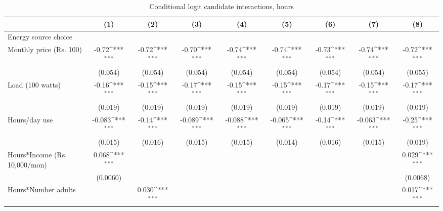\begin{table}[htbp]\centering
\def\sym#1{\ifmmode^{#1}\else\(^{#1}\)\fi}
\caption{Conditional logit candidate interactions, hours}
\begin{tabular*}{1\hsize}{@{\hskip\tabcolsep\extracolsep\fill}l*{8}{c}}
\toprule
                &\multicolumn{1}{c}{(1)}         &\multicolumn{1}{c}{(2)}         &\multicolumn{1}{c}{(3)}         &\multicolumn{1}{c}{(4)}         &\multicolumn{1}{c}{(5)}         &\multicolumn{1}{c}{(6)}         &\multicolumn{1}{c}{(7)}         &\multicolumn{1}{c}{(8)}         \\
\midrule
Energy source choice&                  &                  &                  &                  &                  &                  &                  &                  \\
Monthly price (Rs. 100)&    -0.72\sym{***}&    -0.72\sym{***}&    -0.70\sym{***}&    -0.74\sym{***}&    -0.74\sym{***}&    -0.73\sym{***}&    -0.74\sym{***}&    -0.72\sym{***}\\
                &  (0.054)         &  (0.054)         &  (0.054)         &  (0.054)         &  (0.054)         &  (0.054)         &  (0.054)         &  (0.055)         \\
Load (100 watts)&    -0.16\sym{***}&    -0.15\sym{***}&    -0.17\sym{***}&    -0.15\sym{***}&    -0.15\sym{***}&    -0.17\sym{***}&    -0.15\sym{***}&    -0.17\sym{***}\\
                &  (0.019)         &  (0.019)         &  (0.019)         &  (0.019)         &  (0.019)         &  (0.019)         &  (0.019)         &  (0.019)         \\
Hours/day use   &   -0.083\sym{***}&    -0.14\sym{***}&   -0.089\sym{***}&   -0.088\sym{***}&   -0.065\sym{***}&    -0.14\sym{***}&   -0.063\sym{***}&    -0.25\sym{***}\\
                &  (0.015)         &  (0.016)         &  (0.015)         &  (0.015)         &  (0.014)         &  (0.016)         &  (0.015)         &  (0.019)         \\
Hours*Income (Rs. 10,000/mon)&    0.068\sym{***}&                  &                  &                  &                  &                  &                  &    0.029\sym{***}\\
                & (0.0060)         &                  &                  &                  &                  &                  &                  & (0.0068)         \\
Hours*Number adults&                  &    0.030\sym{***}&                  &                  &                  &                  &                  &    0.017\sym{***}\\

\end{tabular*}
\end{table}
